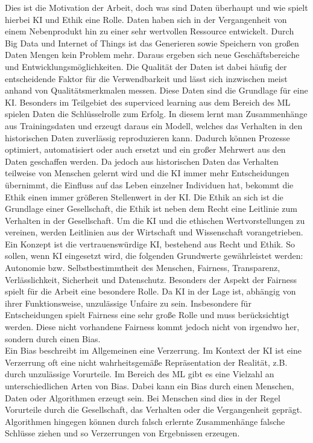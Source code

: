 \begin{onehalfspace}
Dies ist die Motivation der Arbeit, doch was sind Daten überhaupt und wie spielt hierbei KI und Ethik eine Rolle. Daten haben sich in der Vergangenheit von einem Nebenprodukt hin zu einer sehr wertvollen Ressource entwickelt. Durch Big Data und Internet of Things ist das Generieren sowie Speichern von großen Daten Mengen kein Problem mehr. Daraus ergeben sich neue Geschäftsbereiche und Entwicklungsmöglichkeiten. Die Qualität der Daten ist dabei häufig der entscheidende Faktor für die Verwendbarkeit und lässt sich inzwischen meist anhand von Qualitätsmerkmalen messen. Diese Daten sind die Grundlage für eine KI. Besonders im Teilgebiet des superviced learning aus dem Bereich des ML spielen Daten die Schlüsselrolle zum Erfolg. In diesem lernt man Zusammenhänge aus Trainingsdaten und erzeugt daraus ein Modell, welches das Verhalten in den historischen Daten zuverlässig reproduzieren kann. Dadurch können Prozesse optimiert, automatisiert oder auch ersetzt und ein großer Mehrwert aus den Daten geschaffen werden. Da jedoch aus historischen Daten das Verhalten teilweise von Menschen gelernt wird und die KI immer mehr Entscheidungen übernimmt, die Einfluss auf das Leben einzelner Individuen hat, bekommt die Ethik einen immer größeren Stellenwert in der KI. Die Ethik an sich ist die Grundlage einer Gesellschaft, die Ethik ist neben dem Recht eine Leitlinie zum Verhalten in der Gesellschaft. Um die KI und die ethischen Wertvorstellungen zu vereinen, werden Leitlinien aus der Wirtschaft und Wissenschaft vorangetrieben. Ein Konzept ist die vertrauenswürdige KI, bestehend aus Recht und Ethik. So sollen, wenn KI eingesetzt wird, die folgenden Grundwerte gewährleistet werden: Autonomie bzw. Selbstbestimmtheit des Menschen, Fairness, Transparenz, Verlässlichkeit, Sicherheit und Datenschutz. Besonders der Aspekt der Fairness spielt für die Arbeit eine besondere Rolle. Da KI in der Lage ist, abhängig von ihrer Funktionsweise, unzulässige Unfaire zu sein. Insbesondere für Entscheidungen spielt Fairness eine sehr große Rolle und muss berücksichtigt werden. Diese nicht vorhandene Fairness kommt jedoch nicht von irgendwo her, sondern durch einen Bias.\\
Ein Bias beschreibt im Allgemeinen eine Verzerrung. Im Kontext der KI ist eine Verzerrung oft eine nicht wahrheitsgemäße Repräsentation der Realität, z.B. durch unzulässige Vorurteile. Im Bereich des ML gibt es eine Vielzahl an unterschiedlichen Arten von Bias. Dabei kann ein Bias durch einen Menschen, Daten oder Algorithmen erzeugt sein. Bei Menschen sind dies in der Regel Vorurteile durch die Gesellschaft, das Verhalten oder die Vergangenheit geprägt. Algorithmen hingegen können durch falsch erlernte Zusammenhänge falsche Schlüsse ziehen und so Verzerrungen von Ergebnissen erzeugen.\\

\end{onehalfspace}
